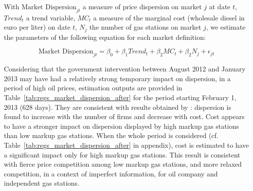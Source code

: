 \documentclass[english]{article}
\begin{document}
With $\text{Market Dispersion}_{jt}$ a measure of price dispersion on market $j$ at date $t$, $Trend_t$ a trend variable, $MC_t$ a measure of the marginal cost (wholesale diesel in euro per liter) on date $t$, $N_j$ the number of gas stations on market $j$, we estimate the parameters of the following equation for each market definition:

\begin{equation}
\text{Market Dispersion}_{jt}= \beta_0 + \beta_1 Trend_t + \beta_2 MC_t + \beta_2 N_j + \epsilon_{jt}
\end{equation}

Considering that the government intervention between August 2012 and January 2013 may have had a relatively strong temporary impact on dispersion, in a period of high oil prices, estimation outputs are provided in Table~\ref{tab:regs_market_dispersion_after} for the period starting February 1, 2013 (628 days). They are consistent with results obtained by \cite{TAP11}: dispersion is found to increase with the number of firms and decrease with cost. Cost appears to have a stronger impact on dispersion displayed by high markup gas stations than low markup gas stations. When the whole period is considered (cf. Table~\ref{tab:regs_market_dispersion_after} in appendix), cost is estimated to have a significant impact only for high markup gas stations. This result is consistent with fierce price competition among low markup gas stations, and more relaxed competition, in a context of imperfect information, for oil company and independent gas stations.
\end{document}
